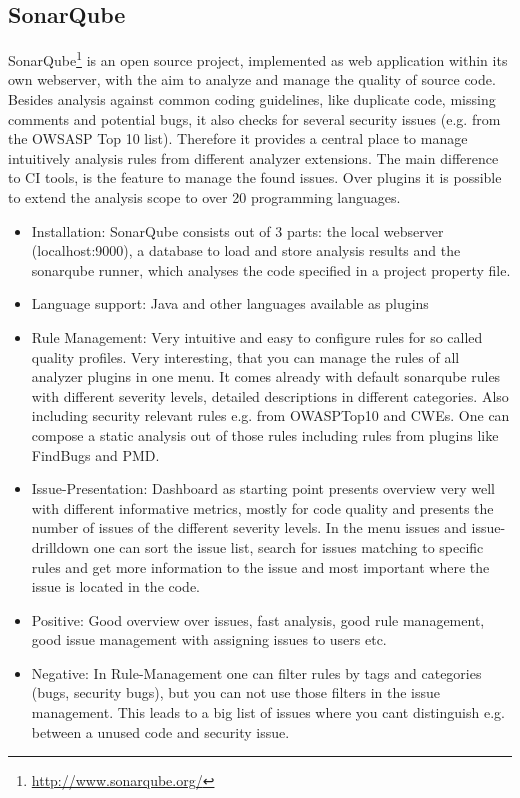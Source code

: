 \documentclass[conference]{IEEEtran}
\begin{document}

\subsection{SonarQube}
\label{subsec:sonarqube}
SonarQube\footnote{\href{http://www.sonarqube.org/}{http://www.sonarqube.org/}} is an open source project, implemented as web application within its own webserver, with the aim to analyze and manage the quality of source code. 
Besides analysis against common coding guidelines, like duplicate code, missing comments and potential bugs, it also checks for several security issues (e.g. from the OWSASP Top 10 list).
Therefore it provides a central place to manage intuitively analysis rules from different analyzer extensions.
The main difference to CI tools, is the feature to manage the found issues.
Over plugins it is possible to extend the analysis scope to over 20 programming languages.


\begin{itemize}
\item Installation: SonarQube consists out of 3 parts: the local webserver (localhost:9000), a database to load and store analysis results and the sonarqube runner, which analyses the code specified in a project property file.

\item Language support: Java and other languages available as plugins

\item Rule Management: Very intuitive and easy to configure rules for so called quality profiles. Very interesting, that you can manage the rules of all analyzer plugins in one menu. It comes already with default sonarqube rules with different severity levels, detailed descriptions in different categories. Also including security relevant rules e.g. from OWASPTop10 and CWEs. One can compose a static analysis out of those rules including rules from plugins like FindBugs and PMD.

\item Issue-Presentation: Dashboard as starting point presents overview very well with different informative metrics, mostly for code quality and presents the number of issues of the different severity levels.
In the menu issues and issue-drilldown one can sort the issue list, search for issues matching to specific rules and get more information to the issue and most important where the issue is located in the code.

\item Positive: Good overview over issues, fast analysis, good rule management, good issue management with assigning issues to users etc.

\item Negative: In Rule-Management one can filter rules by tags and categories (bugs, security bugs), but you can not use those filters in the issue management. This leads to a big list of issues where you cant distinguish e.g. between a unused code and security issue.
 
\end{itemize}
\end{document}
